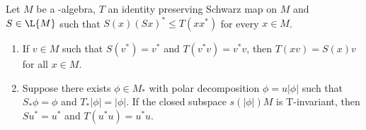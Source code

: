 \begin{lemma}\label{lem:d3-1.2}
Let $M$ be a \WA-algebra, $T$ an identity preserving Schwarz map on $M$ and $S\in\L{M}$ such that $S(x)(Sx)^{*} \leq T(xx^{*})$ for every $x\in M$.
\begin{enumerate}[\upshape (i)]

\item\label{item:d3-1.2-i}
If\/ $v\in M$ such that $S(v^{*}) = v^{*}$ and $T(v^{*}v) = v^{*}v$, then $T(xv) = S(x)v$ for all $x\in M$.

\item\label{item:d3-1.2-ii}
Suppose there exists $\phi\in M_{*}$ with polar decomposition $\phi = u|\phi|$ such that $S_{*}\phi = \phi$ and $T_{*}|\phi| = |\phi|$.
If the closed subspace $s(|\phi|)M$ is T-invariant, then $Su^{*} = u^{*}$ and $T(u^{*}u) = u^{*}u$.
\end{enumerate}
\end{lemma}

